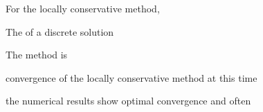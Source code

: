 \documentclass[usenames,dvipsnames,letterpaper,landscape,final]{slides}
\begin{document}
\begin{myslide}

For the locally conservative method, 
\begin{blist}
\item The  of a  discrete solution
\item The method is 
\end{blist}

\begin{blist}
\item convergence of the locally conservative method at this time
\end{blist}

\begin{blist}
\item the numerical results show optimal convergence and often 
\end{blist}

\end{myslide}
\end{document}
